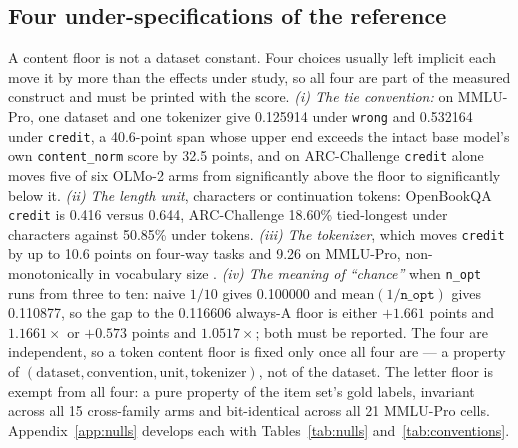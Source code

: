\subsection{Four under-specifications of the reference}
\label{sec:nulls}

A content floor is not a dataset constant. Four choices usually left implicit each move it by more than the effects under study, so all four are part of the measured construct and must be printed with the score. \emph{(i) The tie convention:} on MMLU-Pro, one dataset and one tokenizer give 0.125914 under \texttt{wrong} and 0.532164 under \texttt{credit}, a 40.6-point span whose upper end exceeds the intact base model's own \texttt{content\_norm} score by 32.5 points, and on ARC-Challenge \texttt{credit} alone moves five of six OLMo-2 arms from significantly above the floor to significantly below it. \emph{(ii) The length unit}, characters or continuation tokens: OpenBookQA \texttt{credit} is 0.416 versus 0.644, ARC-Challenge 18.60\% tied-longest under characters against 50.85\% under tokens. \emph{(iii) The tokenizer}, which moves \texttt{credit} by up to 10.6 points on four-way tasks and 9.26 on MMLU-Pro, non-monotonically in vocabulary size \citep{oostermeijer2026length}. \emph{(iv) The meaning of ``chance''} when \texttt{n\_opt} runs from three to ten: naive $1/10$ gives 0.100000 and $\mathrm{mean}(1/\texttt{n\_opt})$ gives 0.110877, so the gap to the 0.116606 always-A floor is either $+1.661$ points and $1.1661\times$ or $+0.573$ points and $1.0517\times$; both must be reported. The four are independent, so a token content floor is fixed only once all four are --- a property of $(\text{dataset},\text{convention},\text{unit},\text{tokenizer})$, not of the dataset. The letter floor is exempt from all four: a pure property of the item set's gold labels, invariant across all 15 cross-family arms and bit-identical across all 21 MMLU-Pro cells. Appendix~\ref{app:nulls} develops each with Tables~\ref{tab:nulls} and~\ref{tab:conventions}.
